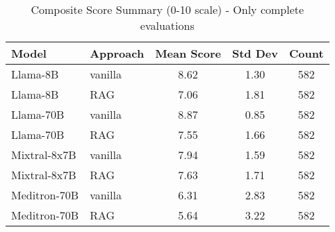 \begin{table}[h]
\centering
\begin{tabular}{llccc}
\toprule
Model & Approach & Mean Score & Std Dev & Count \\
\midrule
Llama-8B & vanilla & 8.62 & 1.30 & 582 \\
Llama-8B & RAG & 7.06 & 1.81 & 582 \\


Llama-70B & vanilla & 8.87 & 0.85 & 582 \\
Llama-70B & RAG & 7.55 & 1.66 & 582 \\

Mixtral-8x7B & vanilla & 7.94 & 1.59 & 582 \\
Mixtral-8x7B & RAG & 7.63 & 1.71 & 582 \\


Meditron-70B & vanilla & 6.31 & 2.83 & 582 \\
Meditron-70B & RAG & 5.64 & 3.22 & 582 \\

\bottomrule
\end{tabular}
\caption{Composite Score Summary (0-10 scale) - Only complete evaluations}
\label{tab:scores_complete}
\end{table}